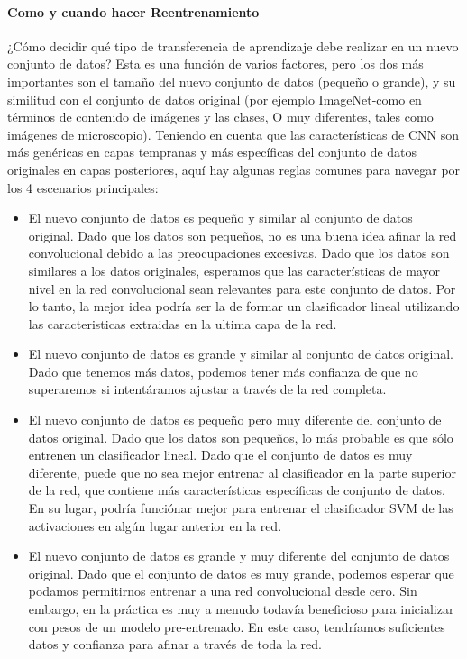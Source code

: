 \documentclass[a4paper,11pt,spanish]{book}
\begin{document}
      \paragraph{Como y cuando hacer Reentrenamiento}
	¿Cómo decidir qué tipo de transferencia de aprendizaje debe realizar en un nuevo conjunto de datos? Esta es una función de varios factores, pero los dos más importantes son el 
	tamaño del nuevo conjunto de datos (pequeño o grande), y su similitud con el conjunto de datos original (por ejemplo ImageNet-como en términos de contenido de imágenes y las clases,
	O muy diferentes, tales como imágenes de microscopio). Teniendo en cuenta que las características de CNN son más genéricas en capas tempranas y más específicas del conjunto de datos
	originales en capas posteriores, aquí hay algunas reglas comunes para navegar por los 4 escenarios principales:
	\begin{itemize}
	  \item El nuevo conjunto de datos es pequeño y similar al conjunto de datos original. Dado que los datos son pequeños, no es una buena idea afinar la red convolucional debido a las 
	  preocupaciones excesivas. Dado que los datos son similares a los datos originales, esperamos que las características de mayor nivel en la red convolucional sean relevantes para este
	  conjunto de datos. Por lo tanto, la mejor idea podría ser la de formar un clasificador lineal utilizando las caracteristicas extraidas en la ultima capa de la red.
	  \item El nuevo conjunto de datos es grande y similar al conjunto de datos original. Dado que tenemos más datos, podemos tener más confianza de que no superaremos si intentáramos 
	  ajustar a través de la red completa.
	  \item El nuevo conjunto de datos es pequeño pero muy diferente del conjunto de datos original. Dado que los datos son pequeños, lo más probable es que sólo entrenen un clasificador 
	  lineal. Dado que el conjunto de datos es muy diferente, puede que no sea mejor entrenar al clasificador en la parte superior de la red, que contiene más características específicas
	  de conjunto de datos. En su lugar, podría funciónar mejor para entrenar el clasificador SVM de las activaciones en algún lugar anterior en la red.
	  \item El nuevo conjunto de datos es grande y muy diferente del conjunto de datos original. Dado que el conjunto de datos es muy grande, podemos esperar que podamos permitirnos 
	  entrenar a una red convolucional desde cero. Sin embargo, en la práctica es muy a menudo todavía beneficioso para inicializar con pesos de un modelo pre-entrenado. 
	  En este caso, tendríamos suficientes datos y confianza para afinar a través de toda la red.
	\end{itemize}
\end{document}
